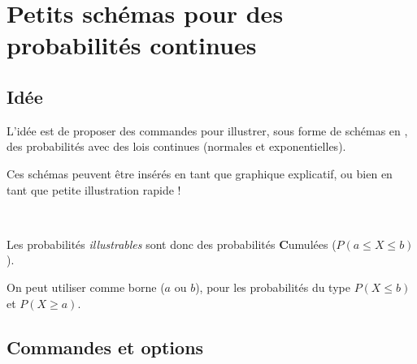 \documentclass{article}
\newcommand\ctex[1]{\tcbox[vignettelatex]{#1}}
\begin{document}
\newpage

\section{Petits schémas pour des probabilités continues}\label{schemasprobas}

\subsection{Idée}

\begin{codeidee}
L'idée est de proposer des commandes pour illustrer, sous forme de schémas en \TikZ, des probabilités avec des lois continues (normales et exponentielles).

\smallskip

Ces \og schémas \fg{} peuvent être insérés en tant que graphique explicatif, ou bien en tant que petite illustration rapide !
\end{codeidee}

\begin{codetex}

\end{codetex}

\begin{codesortie}
\hfill{}\hspace{3cm}\hfill~
\end{codesortie}

\begin{codecles}
Les probabilités \textit{illustrables} sont donc des probabilités \textbf{C}umulées ($P(a\leqslant X\leqslant b)$).

\smallskip

On peut utiliser \ctex{*} comme borne ($a$ ou $b$), pour les probabilités du type $P(X\leqslant b)$ et $P(X \geqslant a)$.
\end{codecles}

\subsection{Commandes et options}
\end{document}
